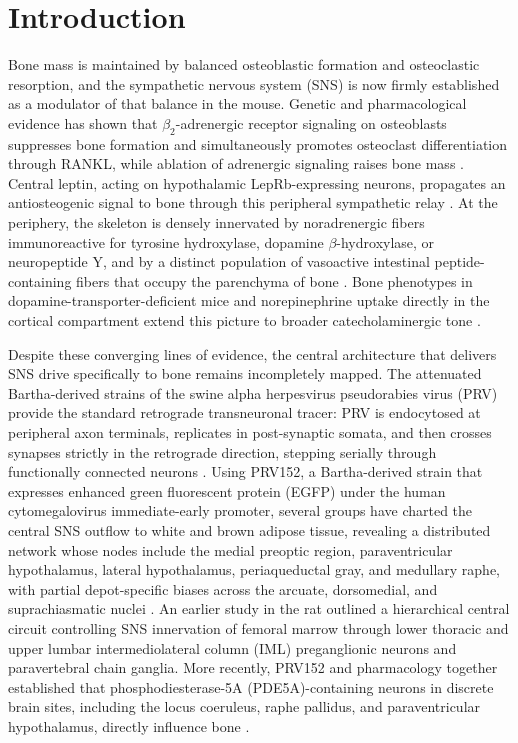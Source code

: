 \documentclass[11pt]{article}
\begin{document}
\section{Introduction}

Bone mass is maintained by balanced osteoblastic formation and osteoclastic resorption, and the sympathetic nervous system (SNS) is now firmly established as a modulator of that balance in the mouse. Genetic and pharmacological evidence has shown that \(\beta_2\)-adrenergic receptor signaling on osteoblasts suppresses bone formation and simultaneously promotes osteoclast differentiation through RANKL, while ablation of adrenergic signaling raises bone mass \citep{takeda2002leptin,elefteriou2005leptin}. Central leptin, acting on hypothalamic LepRb-expressing neurons, propagates an antiosteogenic signal to bone through this peripheral sympathetic relay \citep{ducy2000leptin,flak2016cns}. At the periphery, the skeleton is densely innervated by noradrenergic fibers immunoreactive for tyrosine hydroxylase, dopamine \(\beta\)-hydroxylase, or neuropeptide Y, and by a distinct population of vasoactive intestinal peptide-containing fibers that occupy the parenchyma of bone \citep{hohmann1986innervation,togari2010control}. Bone phenotypes in dopamine-transporter-deficient mice and norepinephrine uptake directly in the cortical compartment extend this picture to broader catecholaminergic tone \citep{bliziotes2000bone,zhu2018cortical}.

Despite these converging lines of evidence, the central architecture that delivers SNS drive specifically to bone remains incompletely mapped. The attenuated Bartha-derived strains of the swine alpha herpesvirus pseudorabies virus (PRV) provide the standard retrograde transneuronal tracer: PRV is endocytosed at peripheral axon terminals, replicates in post-synaptic somata, and then crosses synapses strictly in the retrograde direction, stepping serially through functionally connected neurons \citep{card2001transneuronal,ekstrand2008alpha,card1995influence}. Using PRV152, a Bartha-derived strain that expresses enhanced green fluorescent protein (EGFP) under the human cytomegalovirus immediate-early promoter, several groups have charted the central SNS outflow to white and brown adipose tissue, revealing a distributed network whose nodes include the medial preoptic region, paraventricular hypothalamus, lateral hypothalamus, periaqueductal gray, and medullary raphe, with partial depot-specific biases across the arcuate, dorsomedial, and suprachiasmatic nuclei \citep{bamshad1998central,bamshad1999cns,bartness1998innervation,bartness2014neural,ryu2014short,song2008mc4r,shrestha2010central,brito2007differential,adler2012neurochemical}. An earlier study in the rat outlined a hierarchical central circuit controlling SNS innervation of femoral marrow through lower thoracic and upper lumbar intermediolateral column (IML) preganglionic neurons and paravertebral chain ganglia. More recently, PRV152 and pharmacology together established that phosphodiesterase-5A (PDE5A)-containing neurons in discrete brain sites, including the locus coeruleus, raphe pallidus, and paraventricular hypothalamus, directly influence bone \citep{kim2020pde5a}.
\end{document}
